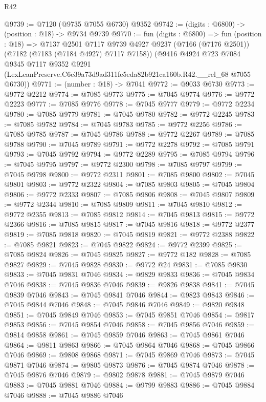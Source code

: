 \begin{lexlean}{R42}
\begin{coremodule}
{@9739 := @7120 (@9735 @7055 @6730) @9352
@9742 := (digits : @6800) -> (position : @18) -> @9734 @9739
@9770 := fun (digits : @6800) =>
  fun (position : @18) =>
  @7137
    @2501
    @7117
    @9739
    @4927
    @9237
    (@7166 (@7176 @2501))
    (@7182 (@7183 (@7184 @4927) @7117 @7158))
    (@9416
      @4924
      @723
      @7084
      @9345
      @7117
      @9352
      @9291
      (LexLeanPreserve.C6e39a73d9ad311fe5eda82b921ca160b.R42.__rel_68 @7055 @6730))
@9771 := (number : @18) -> @7041
@9772 := @9033 @6730
@9773 := @9772 @2212
@9774 := @7085 @9773
@9775 := @7045 @9774
@9776 := @9772 @2223
@9777 := @7085 @9776
@9778 := @7045 @9777
@9779 := @9772 @2234
@9780 := @7085 @9779
@9781 := @7045 @9780
@9782 := @9772 @2245
@9783 := @7085 @9782
@9784 := @7045 @9783
@9785 := @9772 @2256
@9786 := @7085 @9785
@9787 := @7045 @9786
@9788 := @9772 @2267
@9789 := @7085 @9788
@9790 := @7045 @9789
@9791 := @9772 @2278
@9792 := @7085 @9791
@9793 := @7045 @9792
@9794 := @9772 @2289
@9795 := @7085 @9794
@9796 := @7045 @9795
@9797 := @9772 @2300
@9798 := @7085 @9797
@9799 := @7045 @9798
@9800 := @9772 @2311
@9801 := @7085 @9800
@9802 := @7045 @9801
@9803 := @9772 @2322
@9804 := @7085 @9803
@9805 := @7045 @9804
@9806 := @9772 @2333
@9807 := @7085 @9806
@9808 := @7045 @9807
@9809 := @9772 @2344
@9810 := @7085 @9809
@9811 := @7045 @9810
@9812 := @9772 @2355
@9813 := @7085 @9812
@9814 := @7045 @9813
@9815 := @9772 @2366
@9816 := @7085 @9815
@9817 := @7045 @9816
@9818 := @9772 @2377
@9819 := @7085 @9818
@9820 := @7045 @9819
@9821 := @9772 @2388
@9822 := @7085 @9821
@9823 := @7045 @9822
@9824 := @9772 @2399
@9825 := @7085 @9824
@9826 := @7045 @9825
@9827 := @9772 @182
@9828 := @7085 @9827
@9829 := @7045 @9828
@9830 := @9772 @24
@9831 := @7085 @9830
@9833 := @7045 @9831 @7046
@9834 := @9829 @9833
@9836 := @7045 @9834 @7046
@9838 := @7045 @9836 @7046
@9839 := @9826 @9838
@9841 := @7045 @9839 @7046
@9843 := @7045 @9841 @7046
@9844 := @9823 @9843
@9846 := @7045 @9844 @7046
@9848 := @7045 @9846 @7046
@9849 := @9820 @9848
@9851 := @7045 @9849 @7046
@9853 := @7045 @9851 @7046
@9854 := @9817 @9853
@9856 := @7045 @9854 @7046
@9858 := @7045 @9856 @7046
@9859 := @9814 @9858
@9861 := @7045 @9859 @7046
@9863 := @7045 @9861 @7046
@9864 := @9811 @9863
@9866 := @7045 @9864 @7046
@9868 := @7045 @9866 @7046
@9869 := @9808 @9868
@9871 := @7045 @9869 @7046
@9873 := @7045 @9871 @7046
@9874 := @9805 @9873
@9876 := @7045 @9874 @7046
@9878 := @7045 @9876 @7046
@9879 := @9802 @9878
@9881 := @7045 @9879 @7046
@9883 := @7045 @9881 @7046
@9884 := @9799 @9883
@9886 := @7045 @9884 @7046
@9888 := @7045 @9886 @7046
}
\end{coremodule}
\end{lexlean}
